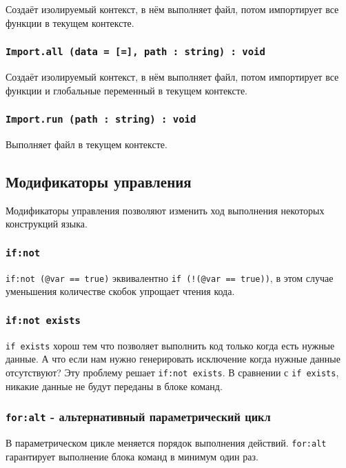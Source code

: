 Создаёт изолируемый контекст, в нём выполняет файл, потом импортирует все функции в текущем контексте.

\subsubsection{\lstinline|Import.all (data = [=], path : string) : void|}

Создаёт изолируемый контекст, в нём выполняет файл, потом импортирует все функции и глобальные переменный в текущем контексте.

\subsubsection{\lstinline|Import.run (path : string) : void|}

Выполняет файл в текущем контексте.

\subsection{Модификаторы управления}

Модификаторы управления позволяют изменить ход выполнения некоторых конструкций языка.

\subsubsection{\lstinline|if:not|}

\lstinline|if:not (@var == true)| эквивалентно \lstinline|if (!(@var == true))|, в этом случае уменьшения количестве скобок упрощает чтения кода. 

\subsubsection{\lstinline|if:not exists|}

\lstinline|if exists| хорош тем что позволяет выполнить код только когда есть нужные данные. А что если нам нужно генерировать исключение когда нужные данные отсутствуют? Эту проблему решает \lstinline|if:not exists|. В сравнении с \lstinline|if exists|, никакие данные не будут переданы в блоке команд.

\subsubsection{\lstinline|for:alt| - альтернативный параметрический цикл}

В параметрическом цикле меняется порядок выполнения действий. \lstinline|for:alt| гарантирует выполнение блока команд в минимум один раз.

